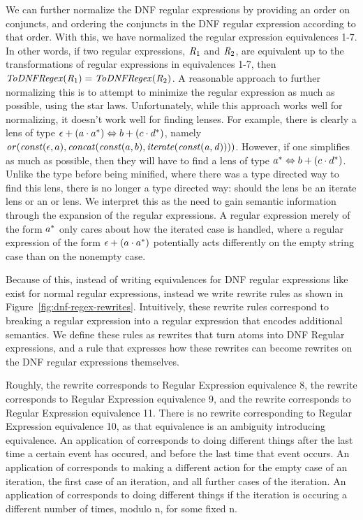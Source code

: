 We can further normalize the DNF regular expressions by providing an order on conjuncts,
and ordering the conjuncts in the DNF regular expression according to that order.
With this, we have normalized the regular expression equivalences 1-7.
In other words, if two regular expressions, $\mathit{R}_1$ and $\mathit{R}_2$,
are equivalent up to the transformations of regular expressions in equivalences 1-7,
then $\mathit{ToDNFRegex}(\mathit{R}_1)=\mathit{ToDNFRegex}(\mathit{R}_2)$.
A reasonable approach to further normalizing this is to attempt to minimize the
regular expression as much as possible, using the star laws.
Unfortunately, while this approach works well for normalizing, it doesn't work
well for finding lenses.  For example, there is clearly a lens of type
$\epsilon+(a\cdot a^*) \Leftrightarrow b+(c\cdot d^*)$,
namely $\mathit{or}(\mathit{const}(\epsilon,a),\mathit{concat}(\mathit{const}(a,b),\mathit{iterate(\mathit{const}(a,d))}))$.
However, if one simplifies as much as possible, then they will have to find a lens
of type $a^* \Leftrightarrow b+(c\cdot d^*)$.
Unlike the type before being minified, where there was a type directed way to find
this lens, there is no longer a type directed way: should the lens be an iterate lens
or an or lens.
We interpret this as the need to gain semantic information through the expansion of
the regular expressions.
A regular expression merely of the form $a^*$ only cares about how the iterated case is handled, where a regular expression of the form
$\epsilon+(a\cdot a^*)$ potentially acts differently on the empty
string case than on the nonempty case.


Because of this, instead of writing equivalences for DNF regular expressions like
exist for normal regular expressions,
instead we write rewrite rules as shown in
Figure~\ref{fig:dnf-regex-rewrites}.
Intuitively, these rewrite rules correspond to breaking a regular expression
into a regular expression that encodes additional semantics.
We define these rules as rewrites that turn atoms into DNF Regular expressions,
and a rule that expresses how these rewrites can become rewrites on
the DNF regular expressions themselves.

Roughly, the \AtomSumstarRule{} rewrite corresponds to Regular Expression equivalence 8,
the \AtomUnrollstarRule{} rewrite corresponds to Regular Expression equivalence 9,
and the \AtomPowerstarRule{} rewrite corresponds to Regular Expression equivalence 11.
There is no rewrite corresponding to Regular Expression equivalence 10, as that
equivalence is an ambiguity introducing equivalence.
An application of \AtomSumstarRule{} corresponds to doing different things after the last time a certain event has occured, and before the last time that event occurs.
An application of \AtomUnrollstarRule{} corresponds to making a different action for
the empty case of an iteration, the first case of an iteration, and all further cases of the iteration.
An application of \AtomPowerstarRule{} corresponds to doing different things if the iteration
is occuring a different number of times, modulo n, for some fixed n.

